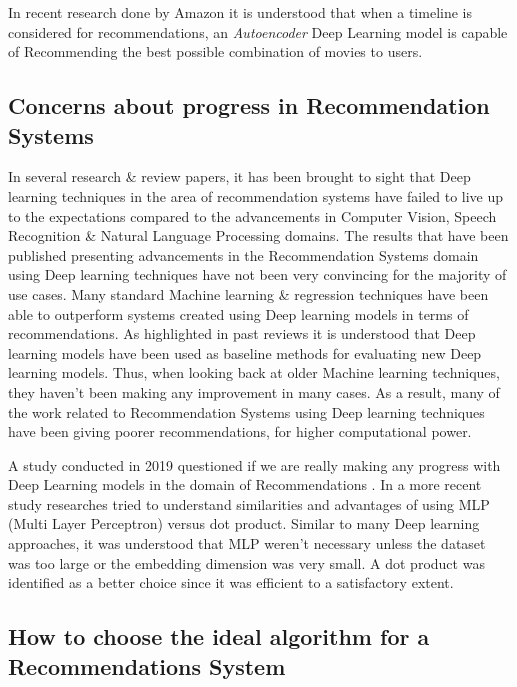 In recent research done by Amazon \autocite{larry_history_2019} it is understood that when a timeline is considered for recommendations, an \emph{Autoencoder} Deep Learning model is capable of Recommending the best possible combination of movies to users.


\subsection{Concerns about progress in Recommendation Systems}
In several research \& review papers, it has been brought to sight that Deep learning techniques in the area of recommendation systems have failed to live up to the expectations compared to the advancements in Computer Vision, Speech Recognition \& Natural Language Processing domains\autocite{choi_local_2021}. The results that have been published presenting advancements in the Recommendation Systems domain using Deep learning techniques have not been very convincing for the majority of use cases. Many standard Machine learning \& regression techniques have been able to outperform systems created using Deep learning models in terms of recommendations. As highlighted in past reviews \autocite{dacrema_are_2019} it is understood that Deep learning models have been used as baseline methods for evaluating new Deep learning models. Thus, when looking back at older Machine learning techniques, they haven't been making any improvement in many cases. As a result, many of the work related to Recommendation Systems using Deep learning techniques have been giving poorer recommendations, for higher computational power.


A study conducted in 2019 questioned if we are really making any progress with Deep Learning models in the domain of Recommendations \autocite{dacrema_are_2019}. In a more recent study researches tried to understand similarities and advantages of using MLP (Multi Layer Perceptron) versus dot product\autocite{rendle_neural_2020}. Similar to many Deep learning approaches, it was understood that MLP weren't necessary unless the dataset was too large or the embedding dimension was very small. A dot product was identified as a better choice since it was efficient to a satisfactory extent.

\subsection{How to choose the ideal algorithm for a Recommendations System}

